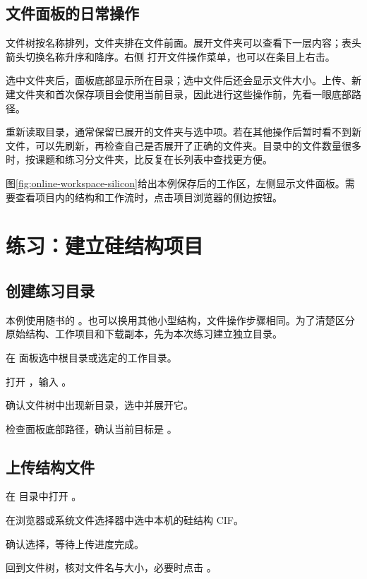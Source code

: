 \subsection{文件面板的日常操作}

文件树按名称排列，文件夹排在文件前面。展开文件夹可以查看下一层内容；表头箭头切换名称升序和降序。右侧  打开文件操作菜单，也可以在条目上右击。

选中文件夹后，面板底部显示所在目录；选中文件后还会显示文件大小。上传、新建文件夹和首次保存项目会使用当前目录，因此进行这些操作前，先看一眼底部路径。

 重新读取目录，通常保留已展开的文件夹与选中项。若在其他操作后暂时看不到新文件，可以先刷新，再检查自己是否展开了正确的文件夹。目录中的文件数量很多时，按课题和练习分文件夹，比反复在长列表中查找更方便。

图\ref{fig:online-workspace-silicon}给出本例保存后的工作区，左侧显示文件面板。需要查看项目内的结构和工作流时，点击项目浏览器的侧边按钮。

\section{练习：建立硅结构项目}

\subsection{创建练习目录}

本例使用随书的 。也可以换用其他小型结构，文件操作步骤相同。为了清楚区分原始结构、工作项目和下载副本，先为本次练习建立独立目录。

\begin{steps}
\item 在  面板选中根目录或选定的工作目录。
\item 打开 ，输入 。
\item 确认文件树中出现新目录，选中并展开它。
\item 检查面板底部路径，确认当前目标是 。
\end{steps}

\subsection{上传结构文件}

\begin{steps}
\item 在  目录中打开 。
\item 在浏览器或系统文件选择器中选中本机的硅结构 CIF。
\item 确认选择，等待上传进度完成。
\item 回到文件树，核对文件名与大小，必要时点击 。
\end{steps}

